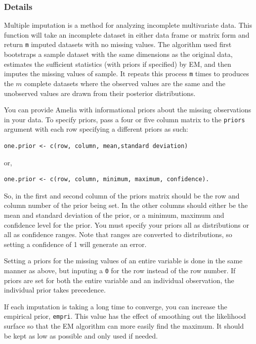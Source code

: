 \documentclass[12pt,titlepage]{article}
\begin{document}
\subsubsection*{Details}
Multiple imputation is a method for analyzing incomplete multivariate data.  This function will take an incomplete dataset in
  either data frame or matrix form and return \texttt{m} imputed datasets
  with no missing values. The algorithm used first bootstraps a sample dataset
  with the same dimensions as the original data, estimates the sufficient statistics (with priors if specified) by EM, and then imputes the missing
  values of sample.  It repeats this process \texttt{m} times to produces
  the $m$ complete datasets where the observed values are the same and the unobserved values are drawn from their posterior distributions.

  You can provide Amelia with informational priors about the missing
  observations in your data.  To specify priors, pass a four or five
  column matrix to the \texttt{priors} argument with each row specifying a
  different priors as such:

\begin{verbatim} 
one.prior <- c(row, column, mean,standard deviation)
\end{verbatim}

or,

\begin{verbatim} 
one.prior <- c(row, column, minimum, maximum, confidence).
\end{verbatim}

  So, in the first and second column of the priors matrix should be the
  row and column number of the prior being set.  In the other columns
  should either be the mean and standard deviation of the prior, or a
  minimum, maximum and confidence level for the prior. You must specify
  your priors all as distributions or all as confidence ranges.  Note
  that ranges are converted to distributions, so setting a confidence of
  1 will generate an error.

  Setting a priors for the missing values of an entire variable is done
  in the same manner as above, but inputing a \texttt{0} for the row
  instead of the row number.  If priors are set for both the entire
  variable and an individual observation, the individual prior takes
  precedence.

  If each imputation is taking a long time to converge, you can increase
  the empirical prior, \texttt{empri}.  This value has the effect of smoothing
  out the likelihood surface so that the EM algorithm can more easily find
  the maximum.  It should be kept as low as possible and only used if needed.
  
\end{document}
